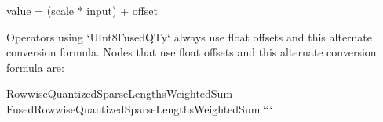  value = (scale $\ast$ input) + offset 
\begin{DoxyCode}
Operators using `UInt8FusedQTy` always use float offsets and this alternate
conversion formula. Nodes that use float offsets and this alternate conversion
formula are:
\end{DoxyCode}
 Rowwise\+Quantized\+Sparse\+Lengths\+Weighted\+Sum Fused\+Rowwise\+Quantized\+Sparse\+Lengths\+Weighted\+Sum ``` 